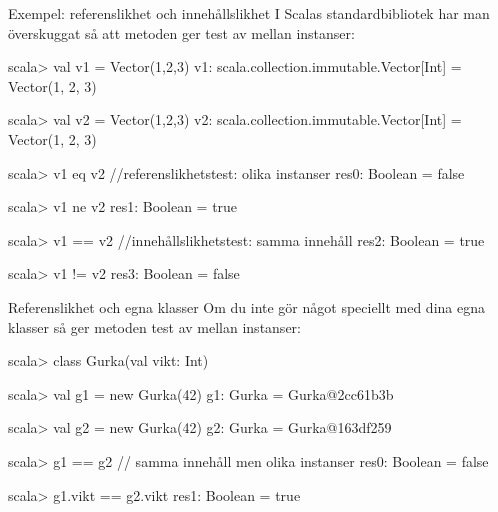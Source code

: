 \begin{Slide}{Exempel: referenslikhet och innehållslikhet}
I Scalas standardbibliotek har man överskuggat  så att metoden \code{==} ger test av  mellan instanser:
\begin{REPL}
scala> val v1 = Vector(1,2,3)
v1: scala.collection.immutable.Vector[Int] = Vector(1, 2, 3)

scala> val v2 = Vector(1,2,3)
v2: scala.collection.immutable.Vector[Int] = Vector(1, 2, 3)

scala> v1 eq v2                //referenslikhetstest: olika instanser
res0: Boolean = false

scala> v1 ne v2
res1: Boolean = true

scala> v1 == v2                //innehållslikhetstest: samma innehåll
res2: Boolean = true

scala> v1 != v2
res3: Boolean = false
\end{REPL}
\end{Slide}


\begin{Slide}{Referenslikhet och egna klasser}
Om du inte gör något speciellt med dina egna klasser så ger metoden \code{==} test av  mellan instanser:
\begin{REPLnonum}
scala> class Gurka(val vikt: Int)

scala> val g1 = new Gurka(42)
g1: Gurka = Gurka@2cc61b3b

scala> val g2 = new Gurka(42)
g2: Gurka = Gurka@163df259

scala> g1 == g2       // samma innehåll men olika instanser
res0: Boolean = false

scala> g1.vikt == g2.vikt
res1: Boolean = true
\end{REPLnonum}
\end{Slide}

\ifkompendium\else
\fi
